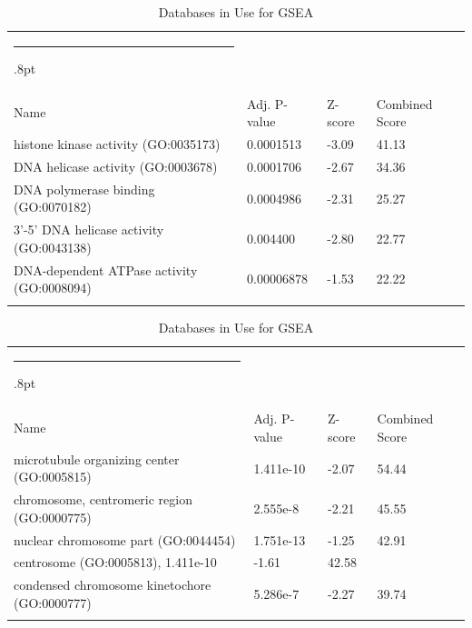 \documentclass[3p,authoryear,preprint,12pt]{elsarticle}
\makeatletter
\def\hlinewd#1{%
  \noalign{\ifnum0=`}\fi\hrule \@height #1%
  \futurelet\reserved@a\@xhline}
\def\tbltoprule{\hlinewd{.8pt}\\[-12pt]}
\def\tblbottomrule{\noalign{\vspace*{6pt}}\hline\noalign{\vspace*{2pt}}}
\def\tblmidrule{\noalign{\vspace*{6pt}}\hline\noalign{\vspace*{2pt}}}
\makeatother
\begin{document}
\begin{table}[!htbp]
	\caption{{Databases in Use for GSEA} }
	\label{tw-de478ae31cc6}
	\def\arraystretch{1}
	\ignorespaces 
	\centering 
	\begin{tabulary}{\linewidth}{p{\dimexpr.65\tabcolsep}p{\dimexpr.15\tabcolsep}p{\dimexpr.1\tabcolsep}p{\dimexpr.1\tabcolsep}}
		\tbltoprule Name & Adj. P-value & Z-score & Combined Score\\
		\tblmidrule
histone kinase activity (GO:0035173) & 0.0001513 & -3.09 & 41.13 \\
DNA helicase activity (GO:0003678) & 0.0001706 & -2.67 & 34.36 \\
DNA polymerase binding (GO:0070182) & 0.0004986 & -2.31 & 25.27 \\
3'-5' DNA helicase activity (GO:0043138) & 0.004400 & -2.80 & 22.77 \\
DNA-dependent ATPase activity (GO:0008094) & 0.00006878 & -1.53 & 22.22 \\
		\tblbottomrule
	\end{tabulary}\par 
\end{table}
\begin{table}[!htbp]
	\caption{{Databases in Use for GSEA} }
	\label{tw-de478ae31cc6}
	\def\arraystretch{1}
	\ignorespaces 
	\centering 
	\begin{tabulary}{\linewidth}{p{\dimexpr.65\tabcolsep}p{\dimexpr.15\tabcolsep}p{\dimexpr.1\tabcolsep}p{\dimexpr.1\tabcolsep}}
		\tbltoprule Name & Adj. P-value & Z-score & Combined Score\\
		\tblmidrule
microtubule organizing center (GO:0005815) & 1.411e-10 & -2.07 & 54.44 \\
chromosome, centromeric region (GO:0000775) & 2.555e-8 & -2.21 & 45.55 \\
nuclear chromosome part (GO:0044454) & 1.751e-13 & -1.25 & 42.91 \\
centrosome (GO:0005813), 1.411e-10 & -1.61 & 42.58 \\
condensed chromosome kinetochore (GO:0000777) & 5.286e-7 & -2.27 & 39.74 \\
		\tblbottomrule
	\end{tabulary}\par 
\end{table}
\end{document}
